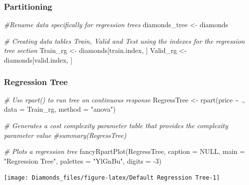 \documentclass[
]{article}
\newenvironment{Shaded}{\begin{snugshade}}{\end{snugshade}}
\newcommand{\AttributeTok}[1]{\textcolor[rgb]{0.77,0.63,0.00}{#1}}
\newcommand{\CommentTok}[1]{\textcolor[rgb]{0.56,0.35,0.01}{\textit{#1}}}
\newcommand{\ConstantTok}[1]{\textcolor[rgb]{0.00,0.00,0.00}{#1}}
\newcommand{\DecValTok}[1]{\textcolor[rgb]{0.00,0.00,0.81}{#1}}
\newcommand{\FunctionTok}[1]{\textcolor[rgb]{0.00,0.00,0.00}{#1}}
\newcommand{\NormalTok}[1]{#1}
\newcommand{\OtherTok}[1]{\textcolor[rgb]{0.56,0.35,0.01}{#1}}
\newcommand{\SpecialCharTok}[1]{\textcolor[rgb]{0.00,0.00,0.00}{#1}}
\newcommand{\StringTok}[1]{\textcolor[rgb]{0.31,0.60,0.02}{#1}}
\begin{document}
\hypertarget{partitioning}{%
\subsubsection{Partitioning}\label{partitioning}}

\begin{Shaded}
\begin{Highlighting}[]
\CommentTok{\#Rename data specifically for regression trees}
\NormalTok{diamonds\_tree }\OtherTok{\textless{}{-}}\NormalTok{ diamonds}

\CommentTok{\# Creating data tables Train, Valid and Test using the indexes for the regression tree section}
\NormalTok{Train\_rg }\OtherTok{\textless{}{-}}\NormalTok{ diamonds[train.index, ]}
\NormalTok{Valid\_rg }\OtherTok{\textless{}{-}}\NormalTok{ diamonds[valid.index, ]}
\end{Highlighting}
\end{Shaded}

\hypertarget{regression-tree-1}{%
\subsubsection{Regression Tree}\label{regression-tree-1}}

\begin{Shaded}
\begin{Highlighting}[]
\CommentTok{\# Use rpart() to run tree on continuous response }
\NormalTok{RegressTree }\OtherTok{\textless{}{-}} \FunctionTok{rpart}\NormalTok{(price }\SpecialCharTok{\textasciitilde{}}\NormalTok{ ., }
              \AttributeTok{data =}\NormalTok{ Train\_rg, }
              \AttributeTok{method =} \StringTok{"anova"}\NormalTok{) }

\CommentTok{\# Generates a cost complexity parameter table that provides the complexity parameter value}
\CommentTok{\#summary(RegressTree)}

\CommentTok{\# Plots a regression tree}
\FunctionTok{fancyRpartPlot}\NormalTok{(RegressTree, }\AttributeTok{caption =} \ConstantTok{NULL}\NormalTok{, }\AttributeTok{main =} \StringTok{"Regression Tree"}\NormalTok{, }\AttributeTok{palettes =} \StringTok{"YlGnBu"}\NormalTok{, }\AttributeTok{digits =} \SpecialCharTok{{-}}\DecValTok{3}\NormalTok{)}
\end{Highlighting}
\end{Shaded}

\begin{center}\texttt{[image: Diamonds\_files/figure-latex/Default Regression Tree-1]} \end{center}
\end{document}
